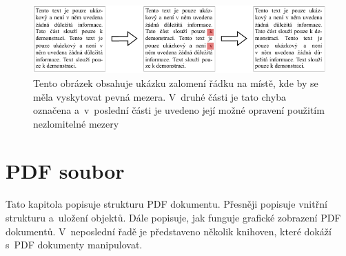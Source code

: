 \begin{figure}[H]
    \centering
    \includegraphics[width=\linewidth]{obrazky-figures/hard_space_example.pdf}
    \caption{
        Tento obrázek obsahuje ukázku zalomení řádku na místě, kde by se měla
        vyskytovat pevná mezera. V~druhé části je tato chyba označena a~v~poslední
        části je uvedeno její možné opravení použitím nezlomitelné mezery
    }
    \label{pic_hard_space}
\end{figure}








\chapter{PDF soubor} \label{PDF_file}
Tato kapitola popisuje strukturu PDF dokumentu. Přesněji popisuje vnitřní
strukturu a~uložení objektů. Dále popisuje, jak funguje grafické zobrazení
PDF dokumentů. V~neposlední řadě je představeno několik knihoven, které
dokáží s~PDF dokumenty manipulovat.



